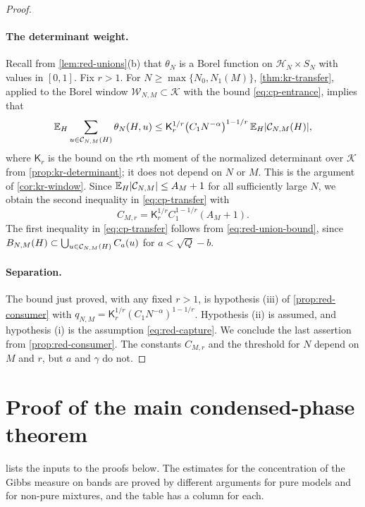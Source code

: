 \begin{proof}
\paragraph{The determinant weight.}
Recall from \cref{lem:red-unions}(b) that $\theta_N$ is a Borel function on $\mathcal H_N\times S_N$ with values in $[0,1]$. Fix $r>1$. For $N\ge\max\{N_0,N_1(M)\}$, \cref{thm:kr-transfer}, applied to the Borel window $\mathcal W_{N,M}\subset\mathcal K$ with the bound \eqref{eq:cp-entrance}, implies that
\begin{equation*}
\mathbb E_H\sum_{u\in\mathcal C_{N,M}(H)}\theta_N(H,u)\le\mathsf K_r^{1/r}\bigl(C_1N^{-\alpha}\bigr)^{1-1/r}\,\mathbb E_H|\mathcal C_{N,M}(H)|,
\end{equation*}
where $\mathsf K_r$ is the bound on the $r$th moment of the normalized determinant over $\mathcal K$ from \cref{prop:kr-determinant}; it does not depend on $N$ or $M$. This is the argument of \cref{cor:kr-window}. Since $\mathbb E_H|\mathcal C_{N,M}|\le A_M+1$ for all sufficiently large $N$, we obtain the second inequality in \eqref{eq:cp-transfer} with
\begin{equation*}
C_{M,r}=\mathsf K_r^{1/r}C_1^{1-1/r}(A_M+1).
\end{equation*}
The first inequality in \eqref{eq:cp-transfer} follows from \eqref{eq:red-union-bound}, since $B_{N,M}(H)\subset\bigcup_{u\in\mathcal C_{N,M}(H)}C_a(u)$ for $a<\sqrt Q-b$.

\paragraph{Separation.}
The bound just proved, with any fixed $r>1$, is hypothesis (iii) of \cref{prop:red-consumer} with $q_{N,M}=\mathsf K_r^{1/r}(C_1N^{-\alpha})^{1-1/r}$. Hypothesis (ii) is assumed, and hypothesis (i) is the assumption \eqref{eq:red-capture}. We conclude the last assertion from \cref{prop:red-consumer}. The constants $C_{M,r}$ and the threshold for $N$ depend on $M$ and $r$, but $a$ and $\gamma$ do not.
\end{proof}

\section{Proof of the main condensed-phase theorem}\label{sec:cp-main}

 lists the inputs to the proofs below. The estimates for the concentration of the Gibbs measure on bands are proved by different arguments for pure models and for non-pure mixtures, and the table has a column for each.

